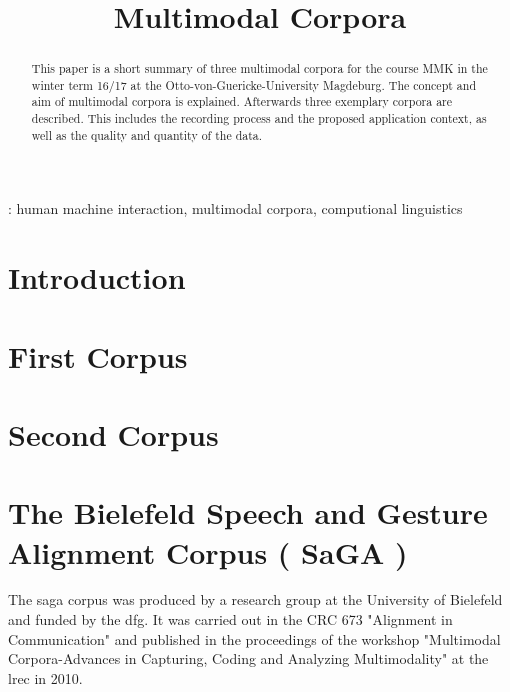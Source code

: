 \documentclass[a4paper]{article}
\title{Multimodal Corpora}
\begin{document}
	\maketitle
  	\begin{abstract}
    	This paper is a short summary of three multimodal corpora for the course MMK in the winter term 16/17 at the Otto-von-Guericke-University Magdeburg. The concept and aim of multimodal corpora is explained. Afterwards three exemplary corpora are described. This includes the recording process and the proposed application context, as well as the quality and quantity of the data.
  	\end{abstract}
  	: human machine interaction, multimodal corpora, computional linguistics
  	
	
  	\section{Introduction}


	\section{First Corpus}
	
	
	\section{Second Corpus}
	
	
	\section{The Bielefeld Speech and Gesture Alignment Corpus ( SaGA )}
		The \gls{saga} corpus was produced by a research group at the University of Bielefeld and funded by the \gls{dfg}. It was carried out in the CRC 673 "Alignment in Communication" and published in the proceedings of the workshop "Multimodal Corpora-Advances in Capturing, Coding and Analyzing Multimodality" at the \gls{lrec} in 2010.
		
\end{document}
